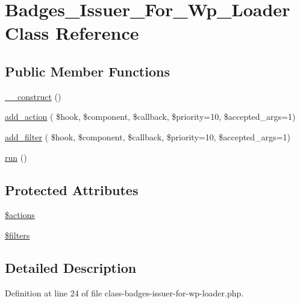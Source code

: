 \hypertarget{class_badges___issuer___for___wp___loader}{}\section{Badges\+\_\+\+Issuer\+\_\+\+For\+\_\+\+Wp\+\_\+\+Loader Class Reference}
\label{class_badges___issuer___for___wp___loader}
\subsection*{Public Member Functions}
\begin{DoxyCompactItemize}
\item 
\hyperlink{class_badges___issuer___for___wp___loader_a095c5d389db211932136b53f25f39685}{\+\_\+\+\_\+construct} ()
\item 
\hyperlink{class_badges___issuer___for___wp___loader_ac0fb7e8a456ea81a1c30020f851f6c36}{add\+\_\+action} ( \$hook, \$component, \$callback, \$priority=10, \$accepted\+\_\+args=1)
\item 
\hyperlink{class_badges___issuer___for___wp___loader_a4439fdd53cfd224aaa9cb360f641958d}{add\+\_\+filter} ( \$hook, \$component, \$callback, \$priority=10, \$accepted\+\_\+args=1)
\item 
\hyperlink{class_badges___issuer___for___wp___loader_afb0fafe7e02a3ae1993c01c19fad2bae}{run} ()
\end{DoxyCompactItemize}
\subsection*{Protected Attributes}
\begin{DoxyCompactItemize}
\item 
\hyperlink{class_badges___issuer___for___wp___loader_a6cafc5f8d4f5d73acc0b5c6daaa766c1}{\$actions}
\item 
\hyperlink{class_badges___issuer___for___wp___loader_ae222f32233a38635bef58d24a13c9df5}{\$filters}
\end{DoxyCompactItemize}


\subsection{Detailed Description}


Definition at line 24 of file class-\/badges-\/issuer-\/for-\/wp-\/loader.\+php.



